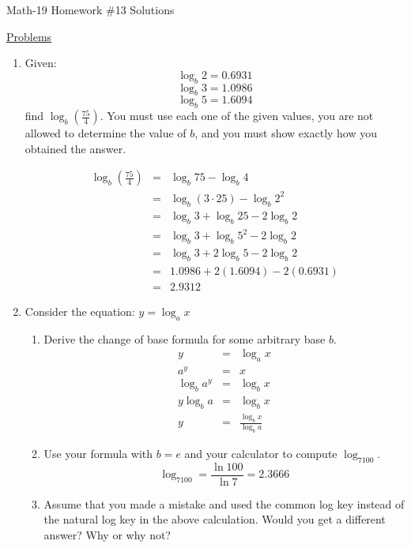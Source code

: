 \documentclass[letterpaper,12pt,fleqn]{article}
\begin{document}
\begin{center}
\Large Math-19 Homework \#13 Solutions
\end{center}

\vspace{0.5in}

\underline{Problems}

\begin{enumerate}

\item Given:
  \[\log_b{2}=0.6931\]
  \[\log_b{3}=1.0986\]
  \[\log_b{5}=1.6094\]
  find $\log_b{\left(\frac{75}{4}\right)}$. You must use each one of the given
  values, you are not allowed to determine the value of $b$, and you must show
  exactly how you obtained the answer.

  \begin{eqnarray*}
    \log_b{\left(\frac{75}{4}\right)} &=& \log_b75-\log_b4 \\
    &=& \log_b(3\cdot25)-\log_b2^2 \\
    &=& \log_b3+\log_b25-2\log_b2 \\
    &=& \log_b3+\log_b5^2-2\log_b2 \\
    &=& \log_b3+2\log_b5-2\log_b2 \\
    &=& 1.0986+2(1.6094)-2(0.6931) \\
    &=& 2.9312
  \end{eqnarray*}

\item Consider the equation: $y=\log_a{x}$
\begin{enumerate}
\item Derive the change of base formula for some arbitrary base $b$.
  \begin{eqnarray*}
    y &=& \log_ax \\
    a^y &=& x \\
    \log_ba^y &=& \log_bx \\
    y\log_ba &=& \log_bx \\
    y &=& \frac{\log_bx}{\log_ba}
  \end{eqnarray*}
  
\item Use your formula with $b=e$ and your calculator to compute $\log_7100$.
  \[\log_7100=\frac{\ln{100}}{\ln7}=2.3666\]
  
\item Assume that you made a mistake and used the common log key instead of the
natural log key in the above calculation. Would you get a different answer?
Why or why not?


\end{enumerate}
\end{enumerate}
\end{document}
